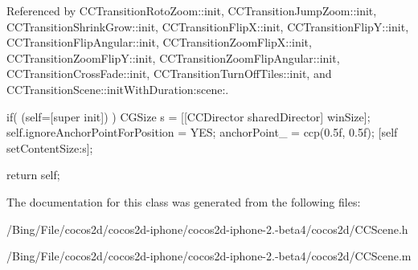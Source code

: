 Referenced by C\-C\-Transition\-Roto\-Zoom\-::init, C\-C\-Transition\-Jump\-Zoom\-::init, C\-C\-Transition\-Shrink\-Grow\-::init, C\-C\-Transition\-Flip\-X\-::init, C\-C\-Transition\-Flip\-Y\-::init, C\-C\-Transition\-Flip\-Angular\-::init, C\-C\-Transition\-Zoom\-Flip\-X\-::init, C\-C\-Transition\-Zoom\-Flip\-Y\-::init, C\-C\-Transition\-Zoom\-Flip\-Angular\-::init, C\-C\-Transition\-Cross\-Fade\-::init, C\-C\-Transition\-Turn\-Off\-Tiles\-::init, and C\-C\-Transition\-Scene\-::init\-With\-Duration\-:scene\-:.


\begin{DoxyCode}
{
        if( (self=[super init]) ) {
                CGSize s = [[CCDirector sharedDirector] winSize];
                self.ignoreAnchorPointForPosition = YES;
                anchorPoint_ = ccp(0.5f, 0.5f);
                [self setContentSize:s];
        }

        return self;
}
\end{DoxyCode}


The documentation for this class was generated from the following files\-:\begin{DoxyCompactItemize}
\item 
/\-Bing/\-File/cocos2d/cocos2d-\/iphone/cocos2d-\/iphone-\/2.-\/beta4/cocos2d/C\-C\-Scene.\-h\item 
/\-Bing/\-File/cocos2d/cocos2d-\/iphone/cocos2d-\/iphone-\/2.-\/beta4/cocos2d/C\-C\-Scene.\-m\end{DoxyCompactItemize}
